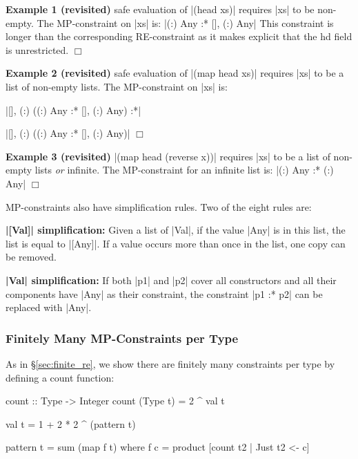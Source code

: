 \documentclass[preprint]{sigplanconf}
\newcommand{\C}[1]{\textsf{#1}}
\newcommand{\noexample}{\hfill\ensuremath{\Box}\par\addvspace{2mm}}
\newcommand{\para}[1]{\vspace{2mm}\noindent\textbf{#1}}
\newenvironment{revisit}[1]
    {\addvspace{2mm}\noindent\textbf{Example #1 (revisited)}}
    {\noexample}
\newcommand{\ignore}{}
\begin{document}
\begin{revisit}{1} safe evaluation of |(head xs)| requires |xs| to be non-empty. The MP-constraint on |xs| is: \ignore|{(:) Any} :* {[], (:) Any}| This constraint is longer than the corresponding RE-constraint as it makes explicit that the \C{hd} field is unrestricted.
\end{revisit}

\begin{revisit}{2} safe evaluation of |(map head xs)| requires |xs| to be a list of non-empty lists. The MP-constraint on |xs| is:

\smallskip
\par\noindent \ignore|{[], (:) ({(:) Any} :* {[], (:) Any})} :*|
\par\noindent \ignore|{[], (:) ({(:) Any} :* {[], (:) Any})}|
\end{revisit}

\begin{revisit}{3} |(map head (reverse x))| requires |xs| to be a list of non-empty lists \textit{or} infinite. The MP-constraint for an infinite list is: \ignore|{(:) Any} :* {(:) Any}|
\end{revisit}

MP-constraints also have simplification rules.  Two of the eight rules are:

\para{\ignore|[Val]| simplification:} Given a list of |Val|, if the value |Any| is in this list, the list is equal to |[Any]|. If a value occurs more than once in the list, one copy can be removed.

\para{|Val| simplification:} If both |p1| and |p2| cover all constructors and all their components have |Any| as their constraint, the constraint |p1 :* p2| can be replaced with |Any|.


\subsubsection{Finitely Many MP-Constraints per Type}

As in \S\ref{sec:finite_re}, we show there are finitely many constraints per type by defining a \C{count} function:

\begin{code}
count :: Type -> Integer
count (Type t) = 2 ^ val t

val t = 1 + 2 * 2 ^ (pattern t)

pattern t = sum (map f t)
    where f c = product [count t2 | Just t2 <- c]
\end{code}
\end{document}
